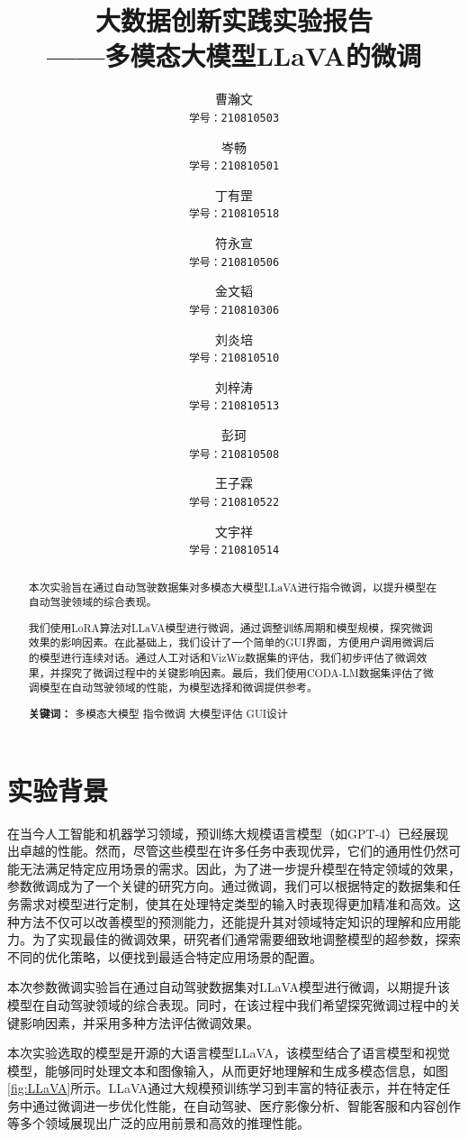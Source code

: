 \documentclass[
    linespread = 1.25
]{ctexart}
\title{\zihao{2}\textbf{大数据创新实践实验报告}\\\zihao{3}\textbf{——多模态大模型LLaVA的微调}}
\author{\zihao{4}曹瀚文 \\\texttt{学号：210810503}
\and \zihao{4}岑畅 \\\texttt{学号：210810501}
\and \zihao{4}丁有罡 \\\texttt{学号：210810518}
\and \zihao{4}符永宣\\\texttt{学号：210810506}
\and \zihao{4}金文韬\\\texttt{学号：210810306}
\and \zihao{4}刘炎培\\\texttt{学号：210810510}
\and \zihao{4}刘梓涛\\\texttt{学号：210810513}
\and \zihao{4}彭珂\\\texttt{学号：210810508}
\and \zihao{4}王子霖\\\texttt{学号：210810522}
\and \zihao{4}文宇祥\\\texttt{学号：210810514}
}
\date{}
\begin{document}
\begin{titlepage}
  \maketitle
  \vspace{0.2cm}
  \begin{abstract}
    \vspace{0.8cm}
    \linespread{1.25}
    本次实验旨在通过自动驾驶数据集对多模态大模型LLaVA进行指令微调，以提升模型在自动驾驶领域的综合表现。
    
    我们使用LoRA算法对LLaVA模型进行微调，通过调整训练周期和模型规模，探究微调效果的影响因素。在此基础上，我们设计了一个简单的GUI界面，方便用户调用微调后的模型进行连续对话。通过人工对话和VizWiz数据集的评估，我们初步评估了微调效果，并探究了微调过程中的关键影响因素。最后，我们使用CODA-LM数据集评估了微调模型在自动驾驶领域的性能，为模型选择和微调提供参考。

    \vspace{1cm}
    \noindent\textbf{关键词：} 多模态大模型\hspace{0.22cm} 指令微调\hspace{0.22cm} 大模型评估\hspace{0.22cm} GUI设计
  \end{abstract}
\end{titlepage}

\tableofcontents
\newpage
\section{实验背景}
在当今人工智能和机器学习领域，预训练大规模语言模型（如GPT-4）已经展现出卓越的性能。然而，尽管这些模型在许多任务中表现优异，它们的通用性仍然可能无法满足特定应用场景的需求。因此，为了进一步提升模型在特定领域的效果，参数微调成为了一个关键的研究方向。通过微调，我们可以根据特定的数据集和任务需求对模型进行定制，使其在处理特定类型的输入时表现得更加精准和高效。这种方法不仅可以改善模型的预测能力，还能提升其对领域特定知识的理解和应用能力。为了实现最佳的微调效果，研究者们通常需要细致地调整模型的超参数，探索不同的优化策略，以便找到最适合特定应用场景的配置。

本次参数微调实验旨在通过自动驾驶数据集对LLaVA模型进行微调，以期提升该模型在自动驾驶领域的综合表现。同时，在该过程中我们希望探究微调过程中的关键影响因素，并采用多种方法评估微调效果。

本次实验选取的模型是开源的大语言模型LLaVA\cite{liu2023llava}，该模型结合了语言模型和视觉模型，能够同时处理文本和图像输入，从而更好地理解和生成多模态信息，如图\ref{fig:LLaVA}所示。LLaVA通过大规模预训练学习到丰富的特征表示，并在特定任务中通过微调进一步优化性能，在自动驾驶、医疗影像分析、智能客服和内容创作等多个领域展现出广泛的应用前景和高效的推理性能。
\end{document}

